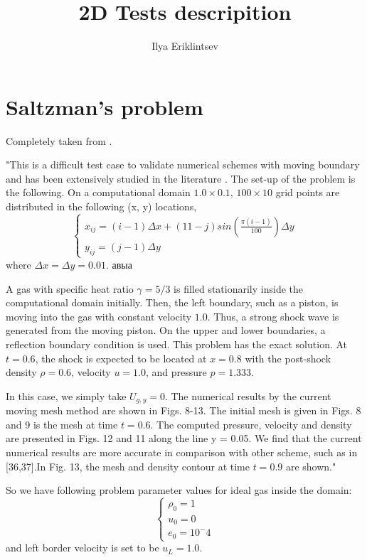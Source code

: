 \documentclass[10pt,a4paper]{article}
\author{Ilya Eriklintsev}
\title{2D Tests descripition}
\begin{document}
\section{Saltzman's problem} 
Completely taken from \cite{Ni2013}.

"This is a difficult test case to validate numerical schemes with moving boundary and has been extensively studied in the literature \cite{Dukowicz1992}. The set-up of the problem is the following. On a computational domain $ 1.0 \times 0.1$, $100 \times 10$ grid points are distributed in the following (x, y) locations,
\[
 \begin{cases}
   x_{ij} = (i-1) \Delta x + (11 - j) sin(\frac{\pi (i-1)}{100}) \Delta y \\
   y_{ij} = (j-1) \Delta y
  \end{cases}
\]
where $\Delta x = \Delta y = 0.01$. авыа

A gas with specific heat ratio $\gamma = 5/3 $ is filled stationarily inside
the computational domain initially. Then, the left boundary, such as a piston, is moving into the gas with constant velocity $1.0$. Thus, a strong shock wave is generated from the moving piston. On the upper and lower boundaries, a reflection boundary condition is used. This problem has the exact solution. At $t = 0.6$, the shock is expected to be located at $x = 0.8$ with the post-shock density $\rho = 0.6$, velocity $u = 1.0$, and pressure $p = 1.333$. 

In this case, we simply take $U_{g,y} = 0$. The numerical results by the current moving mesh method are shown in Figs. 8-13. The initial mesh is given in Figs. 8 and 9 is the mesh at time $t = 0.6$. The computed pressure, velocity and density are presented in Figs. 12 and 11 along the line y = 0.05. We find that the current numerical results are more accurate in comparison with other scheme, such as in [36,37].In Fig. 13, the mesh and density contour at time $t = 0.9$ are shown."

So we have following problem parameter values for ideal gas inside the domain:
\[
  \begin{cases}
    \rho_{0} = 1 \\
    u_{0} = 0 \\
    e_{0} = 10^-4
  \end{cases}
\]
and left border velocity is set to be $u_{L} = 1.0$.

\medskip
 
\printbibliography
\end{document}
